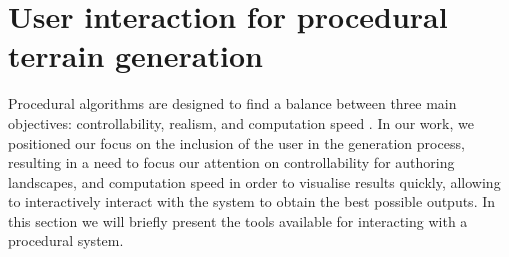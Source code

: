 




\section{User interaction for procedural terrain generation}
Procedural algorithms are designed to find a balance between three main objectives: controllability, realism, and computation speed \cite{Ebert2003,Smelik2014,Galin2019}. In our work, we positioned our focus on the inclusion of the user in the generation process, resulting in a need to focus our attention on controllability for authoring landscapes, and computation speed in order to visualise results quickly, allowing to interactively interact with the system to obtain the best possible outputs. In this section we will briefly present the tools available for interacting with a procedural system.

